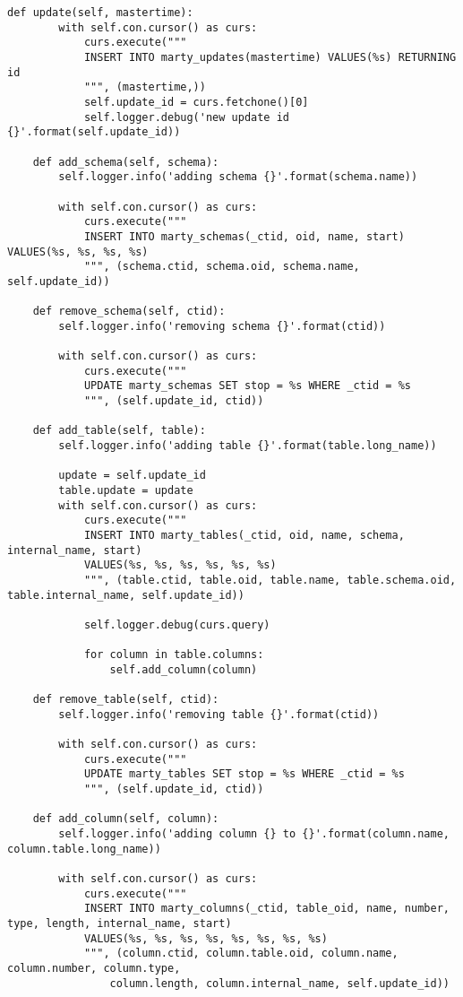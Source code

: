 \begin{lstlisting}[caption={utils/populator.py}]
    def update(self, mastertime):
        with self.con.cursor() as curs:
            curs.execute("""
            INSERT INTO marty_updates(mastertime) VALUES(%s) RETURNING id
            """, (mastertime,))
            self.update_id = curs.fetchone()[0]
            self.logger.debug('new update id {}'.format(self.update_id))

    def add_schema(self, schema):
        self.logger.info('adding schema {}'.format(schema.name))

        with self.con.cursor() as curs:
            curs.execute("""
            INSERT INTO marty_schemas(_ctid, oid, name, start) VALUES(%s, %s, %s, %s)
            """, (schema.ctid, schema.oid, schema.name, self.update_id))

    def remove_schema(self, ctid):
        self.logger.info('removing schema {}'.format(ctid))

        with self.con.cursor() as curs:
            curs.execute("""
            UPDATE marty_schemas SET stop = %s WHERE _ctid = %s
            """, (self.update_id, ctid))

    def add_table(self, table):
        self.logger.info('adding table {}'.format(table.long_name))

        update = self.update_id
        table.update = update
        with self.con.cursor() as curs:
            curs.execute("""
            INSERT INTO marty_tables(_ctid, oid, name, schema, internal_name, start)
            VALUES(%s, %s, %s, %s, %s, %s)
            """, (table.ctid, table.oid, table.name, table.schema.oid, table.internal_name, self.update_id))

            self.logger.debug(curs.query)

            for column in table.columns:
                self.add_column(column)

    def remove_table(self, ctid):
        self.logger.info('removing table {}'.format(ctid))

        with self.con.cursor() as curs:
            curs.execute("""
            UPDATE marty_tables SET stop = %s WHERE _ctid = %s
            """, (self.update_id, ctid))

    def add_column(self, column):
        self.logger.info('adding column {} to {}'.format(column.name, column.table.long_name))

        with self.con.cursor() as curs:
            curs.execute("""
            INSERT INTO marty_columns(_ctid, table_oid, name, number, type, length, internal_name, start)
            VALUES(%s, %s, %s, %s, %s, %s, %s, %s)
            """, (column.ctid, column.table.oid, column.name, column.number, column.type,
                column.length, column.internal_name, self.update_id))


\end{lstlisting}
